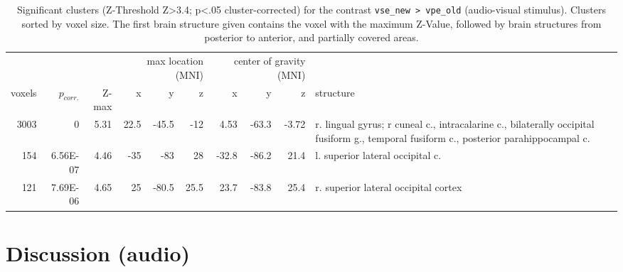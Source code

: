 \documentclass[english]{article}
\begin{document}
\begin{table}[t]
    \caption{Significant clusters (Z-Threshold Z>3.4; p<.05 cluster-corrected) for the contrast \texttt{vse\_new > vpe\_old} (audio-visual stimulus).
Clusters sorted by voxel size.
The first brain structure given contains the voxel with the maximum Z-Value, followed by brain structures from posterior to anterior, and partially covered areas.}
\label{tab:res-ao-group1}
\begin{tabular}{rrrrrrrrrp{3cm}}
\toprule
& & & \multicolumn{3}{r}{max location (MNI)} & \multicolumn{3}{r}{center of gravity (MNI)} &
\\ \cmidrule{4-6} \cmidrule{7-9}
voxels & $p_{corr.}$ & Z-max & x & y & z  & x & y & z & structure \\
\midrule
3003 & 0 & 5.31 & 22.5 & -45.5 & -12 & 4.53 & -63.3 & -3.72 & r. lingual gyrus; r cuneal c., intracalarine c., bilaterally occipital fusiform g., temporal fusiform c., posterior parahippocampal c.  \\
154 & 6.56E-07 & 4.46 & -35 & -83 & 28 & -32.8 & -86.2 & 21.4 & l. superior lateral occipital c. \\
121 & 7.69E-06 & 4.65 & 25 & -80.5 & 25.5 & 23.7 & -83.8 & 25.4 & r. superior lateral occipital cortex \\
\bottomrule
\end{tabular}
\end{table}

\section{Discussion (audio)}
\end{document}
